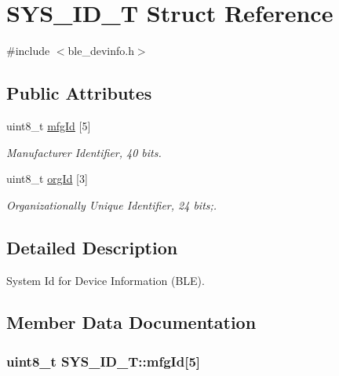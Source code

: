 \hypertarget{struct_s_y_s___i_d___t}{\section{S\-Y\-S\-\_\-\-I\-D\-\_\-\-T Struct Reference}
\label{struct_s_y_s___i_d___t}
}


{\ttfamily \#include $<$ble\-\_\-devinfo.\-h$>$}

\subsection*{Public Attributes}
\begin{DoxyCompactItemize}
\item 
uint8\-\_\-t \hyperlink{struct_s_y_s___i_d___t_a36a75b1bc4c8e4866eb039880b8aad9e}{mfg\-Id} \mbox{[}5\mbox{]}
\begin{DoxyCompactList}\small\item\em Manufacturer Identifier, 40 bits. \end{DoxyCompactList}\item 
uint8\-\_\-t \hyperlink{struct_s_y_s___i_d___t_aaf2c14195d90ec1c9de9b6c57c4fcd94}{org\-Id} \mbox{[}3\mbox{]}
\begin{DoxyCompactList}\small\item\em Organizationally Unique Identifier, 24 bits;. \end{DoxyCompactList}\end{DoxyCompactItemize}


\subsection{Detailed Description}
System Id for Device Information (B\-L\-E). 

\subsection{Member Data Documentation}
\hypertarget{struct_s_y_s___i_d___t_a36a75b1bc4c8e4866eb039880b8aad9e}{
\subsubsection[{mfg\-Id}]{\setlength{\rightskip}{0pt plus 5cm}uint8\-\_\-t S\-Y\-S\-\_\-\-I\-D\-\_\-\-T\-::mfg\-Id\mbox{[}5\mbox{]}}}\label{struct_s_y_s___i_d___t_a36a75b1bc4c8e4866eb039880b8aad9e}



